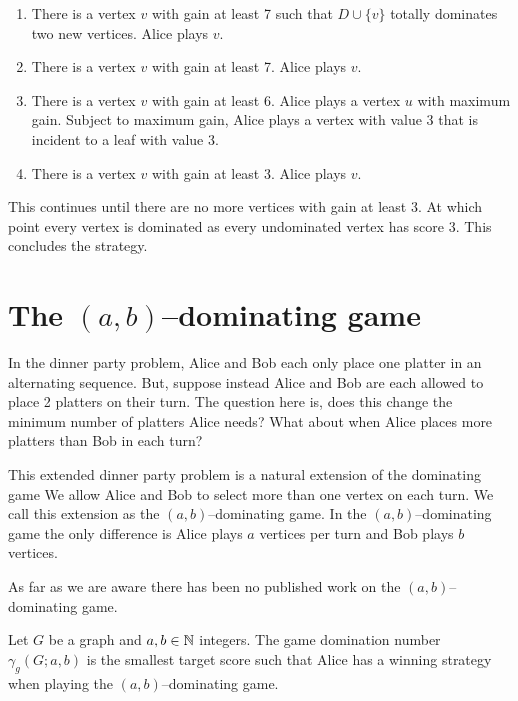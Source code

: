\begin{enumerate}[St{a}ge 1:]
    \item There is a vertex $v$ with gain at least 7 such that $D\cup\{v\}$ totally dominates two new vertices. Alice plays $v$.
    \item There is a vertex $v$ with gain at least 7. Alice plays $v$.
    \item There is a vertex $v$ with gain at least 6. Alice plays a vertex $u$ with maximum gain. Subject to maximum gain, Alice plays a vertex with value 3 that is incident to a leaf with value 3.
    \item There is a vertex $v$ with gain at least 3. Alice plays $v$.
\end{enumerate}
This continues until there are no more vertices with gain at least 3. At which point every vertex is dominated as every undominated vertex has score 3. This concludes the strategy.

\section{The $(a,b)$--dominating game}

In the dinner party problem, Alice and Bob each only place one platter in an alternating sequence. But, suppose instead Alice and Bob are each allowed to place 2 platters on their turn. The question here is, does this change the minimum number of platters Alice needs? What about when Alice places more platters than Bob in each turn?

This extended dinner party problem is a natural extension of the dominating game We allow Alice and Bob to select more than one vertex on each turn. We call this extension as the $(a,b)$--dominating game. In the $(a,b)$--dominating game the only difference is Alice plays $a$ vertices per turn and Bob plays $b$ vertices.

As far as we are aware there has been no published work on the $(a,b)$--dominating game. 

\begin{definition}
    Let $G$ be a graph and $a,b\in\mathbb{N}$ integers. The game domination number $\gamma_g(G;a,b)$ is the smallest target score such that Alice has a winning strategy when playing the $(a,b)$--dominating game.
\end{definition}

